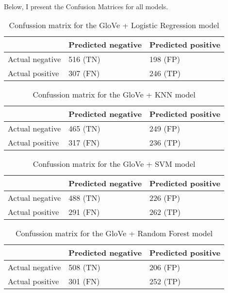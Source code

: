 Below, I present the Confusion Matrices for all models.
\vspace{1cm}



\begin{table}[!htbp]
\centering
{
\makegapedcells
\begin{tabular}{lll}
                & Predicted negative & Predicted positive \\
\hline
Actual negative & 516 (TN)           & 198 (FP) \\
Actual positive & 307 (FN)           & 246 (TP) \\
\hline
\end{tabular}
}
\caption{Confussion matrix for the GloVe + Logistic Regression model}
\label{glovelr_cm}
\end{table}

\begin{table}[!htbp]
\centering
{
\makegapedcells
\begin{tabular}{lll}
                & Predicted negative & Predicted positive \\
\hline
Actual negative & 465 (TN)           & 249 (FP) \\
Actual positive & 317 (FN)           & 236 (TP) \\
\hline
\end{tabular}
}
\caption{Confussion matrix for the GloVe + KNN model}
\label{gloveknn_cm}
\end{table}

\begin{table}[!htbp]
\centering
{
\makegapedcells
\begin{tabular}{lll}
                & Predicted negative & Predicted positive \\
\hline
Actual negative & 488 (TN)           & 226 (FP) \\
Actual positive & 291 (FN)           & 262 (TP) \\
\hline
\end{tabular}
}
\caption{Confussion matrix for the GloVe + SVM model}
\label{glovesvm_cm}
\end{table}

\begin{table}[!htbp]
\centering
{
\makegapedcells
\begin{tabular}{lll}
                & Predicted negative & Predicted positive \\
\hline
Actual negative & 508 (TN)           & 206 (FP) \\
Actual positive & 301 (FN)           & 252 (TP) \\
\hline
\end{tabular}
}
\caption{Confussion matrix for the GloVe + Random Forest model}
\label{gloverf_cm}
\end{table}

